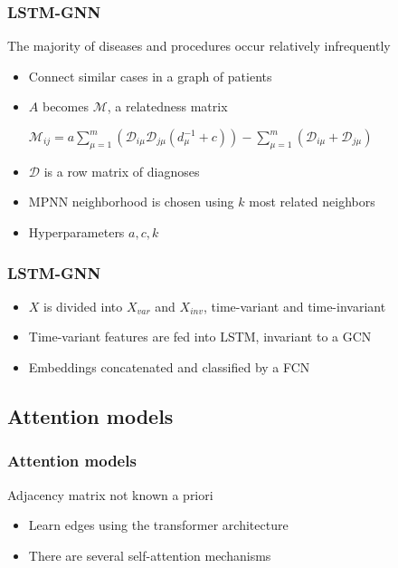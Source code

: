 \documentclass{beamer}
\begin{document}


\begin{frame}
    \frametitle{LSTM-GNN}
	The majority of diseases and procedures occur relatively infrequently
	
    \begin{itemize}
        \item Connect similar cases in a graph of patients
        \item $A$ becomes $\mathcal{M}$, a relatedness matrix
         
        \begin{center}
        $\mathcal{M}_{ij} = a \sum\limits_{\mu = 1}^m (\mathcal{D}_{i\mu}\mathcal{D}_{j\mu}(d_\mu^{-1} + c)) - \sum\limits_{\mu = 1}^m(\mathcal{D}_{i\mu} + \mathcal{D}_{j\mu})$
         \end{center}
         \item $\mathcal{D}$ is a row matrix of diagnoses
         \item MPNN neighborhood is chosen using $k$ most related neighbors
         \item Hyperparameters $a,c,k$
    \end{itemize}
    

    \end{frame}
    


\begin{frame}
    \frametitle{LSTM-GNN}
	
	
    \begin{itemize}
        \item $X$ is divided into $X_{var}$ and $X_{inv}$, time-variant and time-invariant
        \item Time-variant features are fed into LSTM, invariant to a GCN
        \item Embeddings concatenated and classified by a FCN
    \end{itemize}
    

    \end{frame}
    

\subsection{Attention models}

\begin{frame}
    \frametitle{Attention models}
	Adjacency matrix not known a priori
    \begin{itemize}
        \item Learn edges using the transformer architecture
        \item There are several self-attention mechanisms 
    \end{itemize}
    

    \end{frame}
    
\end{document}
